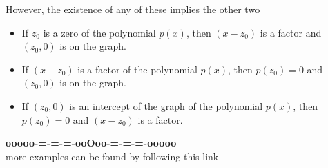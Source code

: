 \documentclass{ximera}
\begin{document}
However, the existence of any of these implies the other two






\begin{itemize}

\item If $z_0$ is a zero of the polynomial $p(x)$, then $(x-z_0)$ is a factor and $(z_0,0)$ is on the graph.


\item If $(x-z_0)$ is a factor of the polynomial $p(x)$, then $p(z_0)=0$ and $(z_0,0)$ is on the graph.


\item If $(z_0,0)$ is an intercept of the graph of the polynomial $p(x)$, then $p(z_0)=0$ and $(x-z_0)$ is a factor.

\end{itemize}












\begin{center}
\textbf{\textcolor{green!50!black}{ooooo-=-=-=-ooOoo-=-=-=-ooooo}} \\

more examples can be found by following this link\\ 

\end{center}
\end{document}
